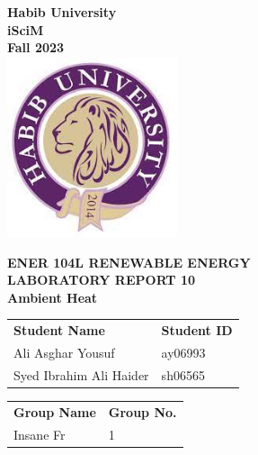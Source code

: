 \documentclass[a4paper, 12pt, english]{article}
\begin{document}
\begin{titlepage}
	\begin{center}
		\textbf{\LARGE Habib University}\\[0.5cm]
		\textbf{\large iSciM}\\[0.2cm]
		\textbf {\large Fall 2023}\\[0.2cm]
		\vspace{20pt}
		\includegraphics[width=5cm]{../habiblogo.jpg}\\[1cm]
		\par
		\vspace{20pt}
		\textbf{\Large ENER 104L RENEWABLE ENERGY}\\
		\vspace{15pt}
		\myrule[1pt][7pt]
		\textbf{\LARGE  LABORATORY REPORT 10}\\
		\vspace{15pt}
		\textbf{\large Ambient Heat}\\
		\myrule[1pt][7pt]
		\vspace{25pt}
		\begin{tabular}{@{}p{5cm}p{3cm}@{}}
			\textbf{\large Student Name} & \textbf{\large Student ID} \\
			Ali Asghar Yousuf            & ay06993                    \\ %
			Syed Ibrahim Ali Haider      & sh06565                    \\ %
		\end{tabular}

		\vspace{10pt}
		\begin{tabular}{@{}p{5cm}p{3cm}@{}}
			\textbf{\large Group Name} & \textbf{\large Group No.} \\
			Insane Fr                  & 1                         \\
		\end{tabular}


\end{center}
\end{titlepage}
\end{document}
